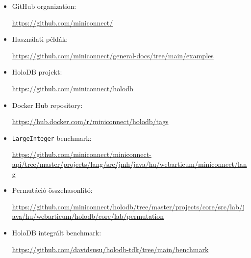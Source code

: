 \documentclass[
    parspace,
    noindent,
    nohyp,
]{elteiktdk}[2023/04/10]
\begin{document}
\begin{itemize}
    \item GitHub organization: \par \url{https://github.com/miniconnect/}
    \item Használati példák: \par \url{https://github.com/miniconnect/general-docs/tree/main/examples}
    \item HoloDB projekt: \par \url{https://github.com/miniconnect/holodb}
    \item Docker Hub repository: \par \url{https://hub.docker.com/r/miniconnect/holodb/tags}
    \item \texttt{LargeInteger} benchmark: \par \url{https://github.com/miniconnect/miniconnect-api/tree/master/projects/lang/src/jmh/java/hu/webarticum/miniconnect/lang}
    \item Permutáció-összehasonlító: \par \url{https://github.com/miniconnect/holodb/tree/master/projects/core/src/lab/java/hu/webarticum/holodb/core/lab/permutation}
    \item HoloDB integrált benchmark: \par \url{https://github.com/davidsusu/holodb-tdk/tree/main/benchmark}
\end{itemize}
\end{document}
